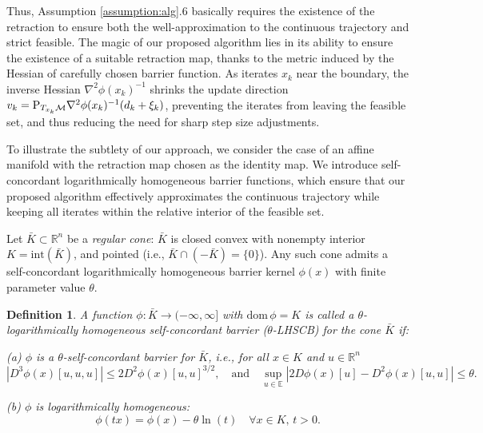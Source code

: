 \documentclass[11pt]{article}
\newtheorem{definition}{Definition}[section]
\begin{document}
Thus, Assumption \ref{assumption:alg}.6 basically requires the existence of the retraction to ensure both the well-approximation to the continuous trajectory and strict feasible. The magic of our proposed algorithm lies in its ability to ensure the existence of a suitable retraction map, thanks to the metric induced by the Hessian of carefully chosen barrier function. As iterates $x_k$ near the boundary, the inverse Hessian $\nabla^2 \phi(x_k)^{-1}$ shrinks the update direction $v_k = {\rm P}_{T_{x_k} \mathcal{M}} \nabla^2 \phi(x_k)^{-1} (d_k + \xi_k)$, preventing the iterates from leaving the feasible set, and thus reducing the need for sharp step size adjustments.



To illustrate the subtlety of our approach, we consider the case of an affine manifold with the retraction map chosen as the identity map. We introduce self-concordant logarithmically homogeneous barrier functions, which ensure that our proposed algorithm effectively approximates the continuous trajectory while keeping all iterates within the relative interior of the feasible set.

Let \(\bar{K} \subset \mathbb{R}^n\) be a \textit{regular cone}: \(\bar{K}\) is closed convex with nonempty interior \(K = \mathrm{int}(\bar{K})\), and pointed (i.e., \(\bar{K} \cap (-\bar{K}) = \{0\}\)). Any such cone admits a self-concordant logarithmically homogeneous barrier kernel \(\phi(x)\) with finite parameter value \(\theta\).
\begin{definition}
A function \(\phi : \bar{K} \to (-\infty, \infty]\) with \(\mathrm{dom} \, \phi = K\) is called a \textit{\(\theta\)-logarithmically homogeneous self-concordant barrier} (\(\theta\)-LHSCB) for the cone \(\bar{K}\) if:

(a) \(\phi\) is a \(\theta\)-self-concordant barrier for \(\bar{K}\), i.e., for all \(x \in K\) and \(u \in \mathbb{R}^n\)
\[
|D^3 \phi(x)[u, u, u]| \leq 2D^2 \phi(x)[u, u]^{3/2}, \quad \text{and} \quad \sup_{u \in \mathbb{E}} |2D \phi(x)[u] - D^2 \phi(x)[u, u]| \leq \theta.
\]

(b) \(\phi\) is \textit{logarithmically homogeneous}:
\[
\phi(tx) = \phi(x) - \theta \ln(t) \quad \forall x \in K, \, t > 0.
\]
\end{definition}
\end{document}
